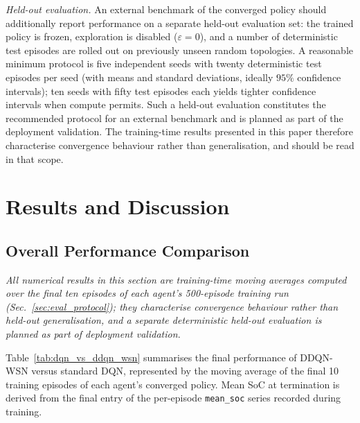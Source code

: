 \documentclass[journal]{IEEEtran}
\begin{document}
\textit{Held-out evaluation.} An external benchmark of the converged
policy should additionally report performance on a separate
held-out evaluation set: the trained policy is frozen, exploration
is disabled ($\varepsilon = 0$), and a number of deterministic test
episodes are rolled out on previously unseen random topologies. A
reasonable minimum protocol is five independent seeds with twenty
deterministic test episodes per seed (with means and standard
deviations, ideally $95\%$ confidence intervals); ten seeds with
fifty test episodes each yields tighter confidence intervals when
compute permits. Such a held-out evaluation constitutes the
recommended protocol for an external benchmark and is planned as part
of the deployment validation. The training-time results presented in
this paper therefore characterise convergence behaviour rather than
generalisation, and should be read in that scope.

\section{Results and Discussion}

\subsection{Overall Performance Comparison}

\emph{All numerical results in this section are training-time moving
averages computed over the final ten episodes of each agent's
500-episode training run
(Sec.~\ref{sec:eval_protocol}); they characterise convergence
behaviour rather than held-out generalisation, and a separate
deterministic held-out evaluation is planned as part of deployment
validation.}

Table~\ref{tab:dqn_vs_ddqn_wsn} summarises the final performance of
DDQN-WSN versus standard DQN, represented by the moving average of
the final 10 training episodes of each agent's converged policy.
Mean SoC at termination is derived from the final entry of the
per-episode \texttt{mean\_soc} series recorded during training.
\end{document}
